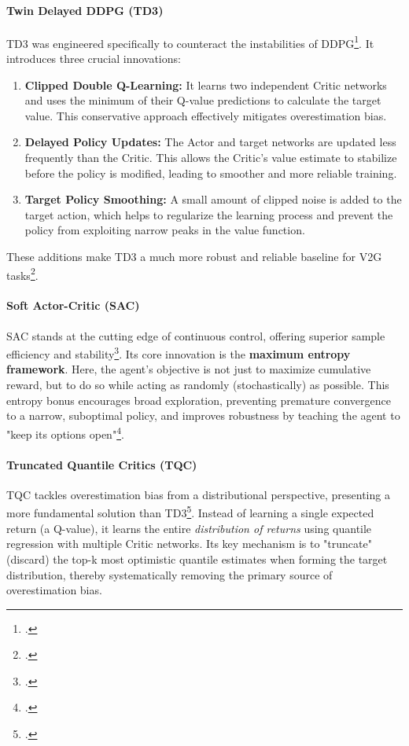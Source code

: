 \paragraph{Twin Delayed DDPG (TD3)}
TD3 was engineered specifically to counteract the instabilities of DDPG\footcite{fujimoto2018addressing}. It introduces three crucial innovations:
\begin{enumerate}
    \item \textbf{Clipped Double Q-Learning:} It learns two independent Critic networks and uses the minimum of their Q-value predictions to calculate the target value. This conservative approach effectively mitigates overestimation bias.
    \item \textbf{Delayed Policy Updates:} The Actor and target networks are updated less frequently than the Critic. This allows the Critic's value estimate to stabilize before the policy is modified, leading to smoother and more reliable training.
    \item \textbf{Target Policy Smoothing:} A small amount of clipped noise is added to the target action, which helps to regularize the learning process and prevent the policy from exploiting narrow peaks in the value function.
\end{enumerate}
These additions make TD3 a much more robust and reliable baseline for V2G tasks\footcite{liu2023optimal, wang2022multi}.

\paragraph{Soft Actor-Critic (SAC)}
SAC stands at the cutting edge of continuous control, offering superior sample efficiency and stability\footcite{haarnoja2019soft}. Its core innovation is the \textbf{maximum entropy framework}. Here, the agent's objective is not just to maximize cumulative reward, but to do so while acting as randomly (stochastically) as possible. This entropy bonus encourages broad exploration, preventing premature convergence to a narrow, suboptimal policy, and improves robustness by teaching the agent to "keep its options open"\footcite{logeshwaran2022comparative}.

\paragraph{Truncated Quantile Critics (TQC)}
TQC tackles overestimation bias from a distributional perspective, presenting a more fundamental solution than TD3\footcite{kuznetsov2020controlling}. Instead of learning a single expected return (a Q-value), it learns the entire \textit{distribution of returns} using quantile regression with multiple Critic networks. Its key mechanism is to "truncate" (discard) the top-k most optimistic quantile estimates when forming the target distribution, thereby systematically removing the primary source of overestimation bias.

